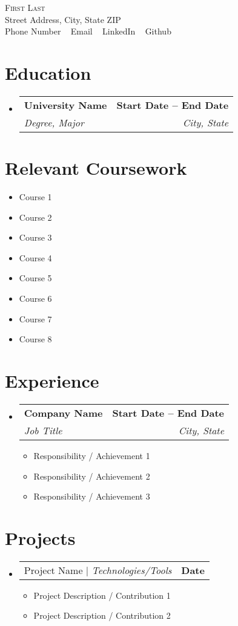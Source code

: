 \documentclass[letterpaper,11pt]{article}
\makeatletter
\newcommand{\resumeItem}[1]{\item\small{#1 \vspace{-2pt}}}
\newcommand{\resumeSubheading}[4]{
  \vspace{-2pt}\item
  \begin{tabular*}{1.0\textwidth}[t]{l@{\extracolsep{\fill}}r}
    \textbf{#1} & \textbf{\small #2} \\
    \textit{\small#3} & \textit{\small #4} \\
  \end{tabular*}\vspace{-7pt}
}
\newcommand{\resumeProjectHeading}[2]{
    \item
    \begin{tabular*}{1.0\textwidth}{l@{\extracolsep{\fill}}r}
      \small#1 & \textbf{\small #2}\\
    \end{tabular*}\vspace{-7pt}
}
\newcommand{\resumeItemListStart}{\begin{itemize}}
\newcommand{\resumeItemListEnd}{\end{itemize}\vspace{-5pt}}
\newcommand{\resumeSubHeadingListStart}{\begin{itemize}[leftmargin=0.0in, label={}]}
\newcommand{\resumeSubHeadingListEnd}{\end{itemize}}
\makeatother
\begin{document}
\begin{center}
    {\Huge \scshape First Last} \\[1pt]
    Street Address, City, State ZIP \\[1pt]
    \small Phone Number ~ Email ~ LinkedIn ~ Github
\end{center}

\section{Education}
\resumeSubHeadingListStart
  \resumeSubheading
    {University Name}{Start Date -- End Date}
    {Degree, Major}{City, State}
\resumeSubHeadingListEnd

\section{Relevant Coursework}
\begin{multicols}{4}
    \begin{itemize}[itemsep=-5pt, parsep=3pt]
        \item Course 1
        \item Course 2
        \item Course 3
        \item Course 4
        \item Course 5
        \item Course 6
        \item Course 7
        \item Course 8
    \end{itemize}
\end{multicols}

\section{Experience}
\resumeSubHeadingListStart
  \resumeSubheading
    {Company Name}{Start Date -- End Date}
    {Job Title}{City, State}
    \resumeItemListStart
        \resumeItem{Responsibility / Achievement 1}
        \resumeItem{Responsibility / Achievement 2}
        \resumeItem{Responsibility / Achievement 3}
    \resumeItemListEnd
\resumeSubHeadingListEnd

\section{Projects}
\resumeSubHeadingListStart
  \resumeProjectHeading
      {Project Name | \emph{Technologies/Tools}}{Date}
      \resumeItemListStart
        \resumeItem{Project Description / Contribution 1}
        \resumeItem{Project Description / Contribution 2}
      \resumeItemListEnd
\resumeSubHeadingListEnd
\end{document}
